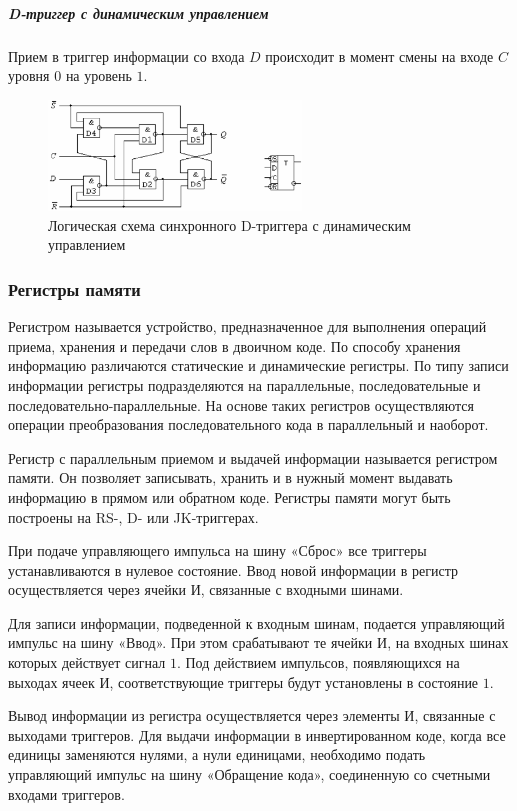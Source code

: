 \documentclass{article}
\begin{document}
\begin{flushleft}
\subparagraph{D-триггер с динамическим управлением}

Прием в триггер информации со входа $D$ происходит в момент смены на входе $C$ уровня $0$ на уровень $1$.

\begin{figure}
\caption{Логическая схема синхронного D-триггера с динамическим управлением}
\includegraphics[width=0.6\textwidth]{assets/synchronous_d_trigger.png}
\end{figure}

\subsubsection{Регистры памяти}

Регистром называется устройство, предназначенное для выполнения операций приема, хранения и передачи слов в двоичном коде. По способу хранения информацию различаются статические и динамические регистры. По типу записи информации регистры подразделяются на параллельные, последовательные и последовательно-параллельные. На основе таких регистров осуществляются операции преобразования последовательного кода в параллельный и наоборот.

\hfill

Регистр с параллельным приемом и выдачей информации называется регистром памяти. Он позволяет записывать, хранить и в нужный момент выдавать информацию в прямом или обратном коде. Регистры памяти могут быть построены на RS-, D- или JK-триггерах.

\hfill

При подаче управляющего импульса на шину «Сброс» все триггеры устанавливаются в нулевое состояние. Ввод новой информации в регистр осуществляется через ячейки И, связанные с входными шинами.

Для записи информации, подведенной к входным шинам, подается управляющий импульс на шину «Ввод». При этом срабатывают те ячейки И, на входных шинах которых действует сигнал $1$. Под действием импульсов, появляющихся на выходах ячеек И, соответствующие триггеры будут установлены в состояние $1$.

Вывод информации из регистра осуществляется через элементы И, связанные с выходами триггеров. Для выдачи информации в инвертированном коде, когда все единицы заменяются нулями, а нули единицами, необходимо подать управляющий импульс на шину «Обращение кода», соединенную со счетными входами триггеров.

\end{flushleft}
\end{document}
